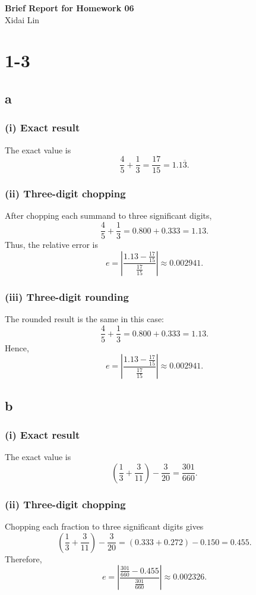 \documentclass[11pt,a4paper]{report}
\theoremstyle{remark}
\begin{document}
\begin{center}
\textbf{Brief Report for Homework 06}\\
Xidai Lin
\end{center}

\section*{1-3}

\subsection*{a}
\subsubsection*{(i) Exact result}
The exact value is
\[
\frac{4}{5}+\frac{1}{3}=\frac{17}{15}=1.1\overline{3}.
\]

\subsubsection*{(ii) Three-digit chopping}
After chopping each summand to three significant digits,
\[
\frac{4}{5}+\frac{1}{3}=0.800+0.333=1.13.
\]
Thus, the relative error is
\[
e=\left|\frac{1.13-\frac{17}{15}}{\frac{17}{15}}\right|
  \approx 0.002941.
\]

\subsubsection*{(iii) Three-digit rounding}
The rounded result is the same in this case:
\[
\frac{4}{5}+\frac{1}{3}=0.800+0.333=1.13.
\]
Hence,
\[
e=\left|\frac{1.13-\frac{17}{15}}{\frac{17}{15}}\right|
  \approx 0.002941.
\]

\subsection*{b}
\subsubsection*{(i) Exact result}
The exact value is
\[
\left(\frac{1}{3}+\frac{3}{11}\right)-\frac{3}{20}=\frac{301}{660}.
\]

\subsubsection*{(ii) Three-digit chopping}
Chopping each fraction to three significant digits gives
\[
\left(\frac{1}{3}+\frac{3}{11}\right)-\frac{3}{20}
=(0.333+0.272)-0.150=0.455.
\]
Therefore,
\[
e=\left|\frac{\frac{301}{660}-0.455}{\frac{301}{660}}\right|
  \approx 0.002326.
\]
\end{document}
